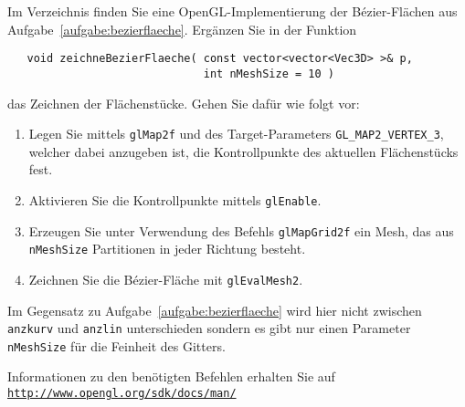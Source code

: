 %
Im Verzeichnis  finden Sie eine 
OpenGL-Implementierung der Bézier-Flächen 
aus Aufgabe~\ref{aufgabe:bezierflaeche}. Ergänzen Sie in der Funktion
\begin{verbatim}
   void zeichneBezierFlaeche( const vector<vector<Vec3D> >& p,
                              int nMeshSize = 10 )
\end{verbatim}
das Zeichnen der Flächenstücke. Gehen Sie dafür wie folgt vor:
\begin{enumerate}
  \item Legen Sie mittels \texttt{glMap2f} und des Target-Parameters 
        \texttt{GL\_MAP2\_VERTEX\_3}, welcher dabei anzugeben ist, die 
        Kontrollpunkte des aktuellen Flächenstücks fest.
  \item Aktivieren Sie die Kontrollpunkte mittels \texttt{glEnable}.
  \item Erzeugen Sie unter Verwendung des Befehls \texttt{glMapGrid2f} 
        ein Mesh, das aus \texttt{nMeshSize} Partitionen in jeder 
        Richtung besteht.
  \item Zeichnen Sie die Bézier-Fläche mit \texttt{glEvalMesh2}.
\end{enumerate}

Im Gegensatz zu Aufgabe~\ref{aufgabe:bezierflaeche} wird hier nicht 
zwischen \texttt{anzkurv} und \texttt{anzlin} unterschieden sondern es
gibt nur einen Parameter \texttt{nMeshSize} für die Feinheit des Gitters.

Informationen zu den benötigten Befehlen erhalten Sie auf\\
\href{http://www.opengl.org/sdk/docs/man/}{\texttt{http://www.opengl.org/sdk/docs/man/}}
